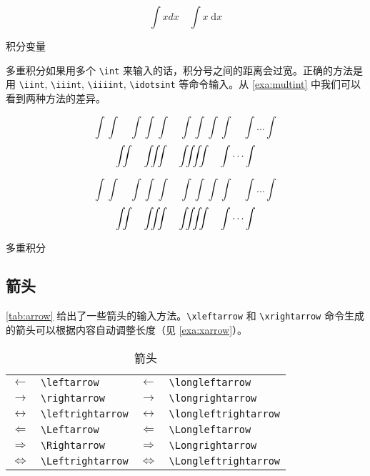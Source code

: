 \begin{example}[h]
\begin{BTDemo}[]
\newcommand{\myd}{\;\mathrm{d}}
\[ \int x dx\quad \int x \myd x \]
\end{BTDemo}
\caption{积分变量}
\label{exa:intvar}
\end{example}

多重积分如果用多个 \verb|\int| 来输入的话，积分号之间的距离会过宽。正确的方法是用 \verb|\iint|, \verb|\iiint|, \verb|\iiiint|, \verb|\idotsint| 等命令输入。从 \autoref{exa:multint} 中我们可以看到两种方法的差异。

\begin{Code}[]
\[ \int\int\quad \int\int\int\quad 
  \int\int\int\int\quad \int\dots\int \]
\[ \iint\quad \iiint\quad \iiiint\quad \idotsint \]
\end{Code}

\begin{example}[h]
\begin{Demo}
\[ \int\int\quad \int\int\int\quad 
  \int\int\int\int\quad \int\dots\int \]
\[ \iint\quad \iiint\quad \iiiint\quad \idotsint \]
\end{Demo}
\caption{多重积分}
\label{exa:multint}
\end{example}

\subsection{箭头}

\autoref{tab:arrow} 给出了一些箭头的输入方法。\verb|\xleftarrow| 和 \verb|\xrightarrow| 命令生成的箭头可以根据内容自动调整长度（见 \autoref{exa:xarrow}）。

\begin{table}[htbp]
\caption{箭头}
\label{tab:arrow}
\centering
\begin{tabular}{llll}
  \toprule
  $\leftarrow$       & \verb|\leftarrow|      & 
    $\longleftarrow$       & \verb|\longleftarrow| \\
  $\rightarrow$      & \verb|\rightarrow|     & 
    $\longrightarrow$      & \verb|\longrightarrow| \\
  $\leftrightarrow$  & \verb|\leftrightarrow| & 
    $\longleftrightarrow$  & \verb|\longleftrightarrow| \\
  $\Leftarrow$       & \verb|\Leftarrow|      & 
    $\Longleftarrow$       & \verb|\Longleftarrow| \\
  $\Rightarrow$      & \verb|\Rightarrow|     & 
    $\Longrightarrow$      & \verb|\Longrightarrow| \\
  $\Leftrightarrow$  & \verb|\Leftrightarrow| & 
    $\Longleftrightarrow$  & \verb|\Longleftrightarrow| \\
  \bottomrule
\end{tabular}
\end{table}

